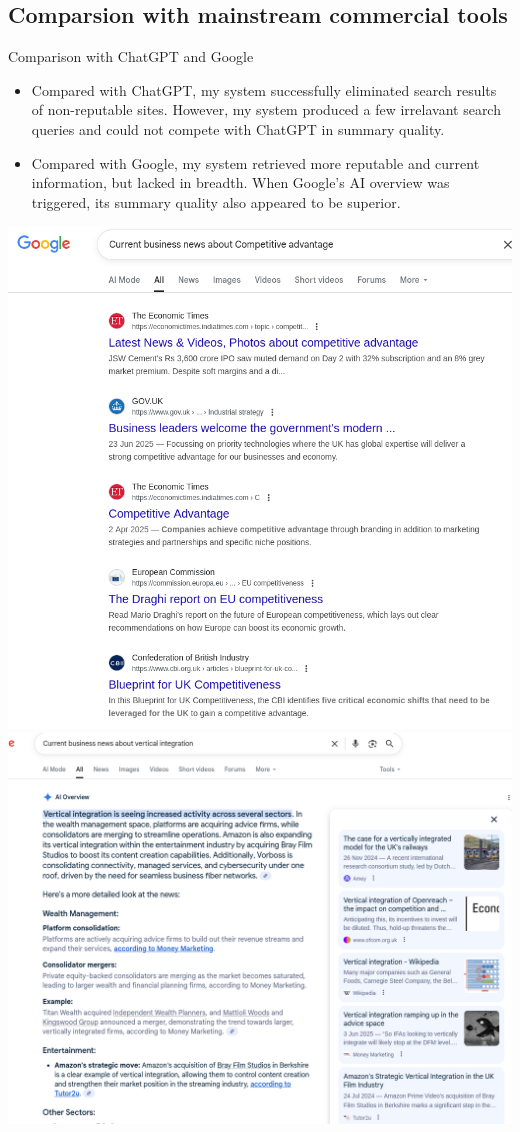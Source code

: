\documentclass{beamer}
\begin{document}
\subsection{Comparsion with mainstream commercial tools}
\begin{frame}{Comparison with ChatGPT and Google}
\begin{itemize}
	\item Compared with ChatGPT, my system successfully eliminated search
		results of non-reputable sites. However, my system produced a few
		irrelavant search queries and could not compete with ChatGPT in summary
		quality. 
	\item Compared with Google, my system retrieved more reputable and current
		information, but lacked in breadth. When Google's AI overview was
		triggered, its summary quality also appeared to be superior.
\end{itemize}
\begin{center}
	\includegraphics[height=.4\textheight]{../../deliverables/thesis/res/google_res1.png}
	\includegraphics[height=.4\textheight]{../../deliverables/thesis/res/google_res2.png}

\end{center}
\end{frame}
\end{document}
